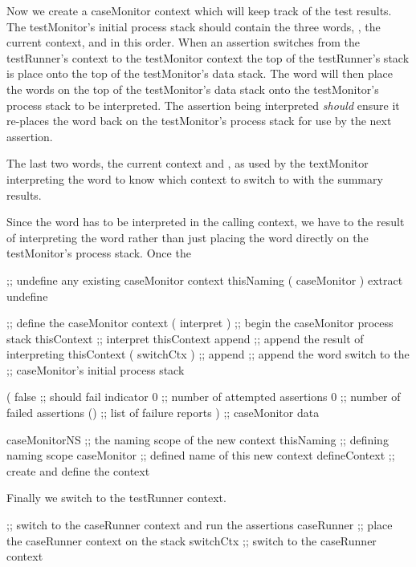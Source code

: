 Now we create a caseMonitor context which will keep track of the test 
results. The testMonitor's initial process stack should contain the three 
words, , the current context, and  in this 
order. When an assertion switches from the testRunner's context to the 
testMonitor context the top of the testRunner's stack is place onto the 
top of the testMonitor's data stack. The  word will then 
place the words on the top of the testMonitor's data stack onto the 
testMonitor's process stack to be interpreted. The assertion being 
interpreted \emph{should} ensure it re-places the  word 
back on the testMonitor's process stack for use by the next assertion. 

The last two words, the current context and , as used by the 
textMonitor interpreting the  word to know which context to 
switch to with the summary results. 

Since the  word has to be interpreted in the calling 
context, we have to  the result of interpreting the 
 word rather than just placing the  
word directly on the testMonitor's process stack. Once the 

\startJoylolCode
  ;; undefine any existing caseMonitor context
  thisNaming
  ( caseMonitor ) extract
  undefine

  ;; define the caseMonitor context
  ( interpret ) ;; begin the caseMonitor process stack
  thisContext   ;; interpret thisContext 
  append        ;; append the result of interpreting thisContext
  ( switchCtx ) ;; 
  append        ;; append the word switch to the
                ;; caseMonitor's initial process stack
  
  ( 
    false       ;; should fail indicator
    0           ;; number of attempted assertions
    0           ;; number of failed assertions
    ()          ;; list of failure reports
  )             ;; caseMonitor data

  caseMonitorNS ;; the naming scope of the new context
  thisNaming    ;; defining naming scope
  caseMonitor   ;; defined name of this new context
  defineContext ;; create and define the context
\stopJoylolCode

Finally we switch to the testRunner context.

\startJoylolCode
  ;; switch to the caseRunner context and run the assertions
  caseRunner ;; place the caseRunner context on the stack
  switchCtx  ;; switch to the caseRunner context
  
